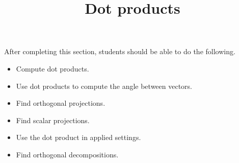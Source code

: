 \documentclass{ximera}
\title{Dot products}
\begin{document}
\begin{abstract}
\end{abstract}

\maketitle

\begin{sectionOutcomes}

After completing this section, students should be able to do the following.

\begin{itemize}
\item Compute dot products.
\item Use dot products to compute the angle between vectors.
\item Find orthogonal projections.
\item Find scalar projections.
\item Use the dot product in applied settings.
\item Find orthogonal decompositions.
\end{itemize}

\end{sectionOutcomes}
\end{document}
